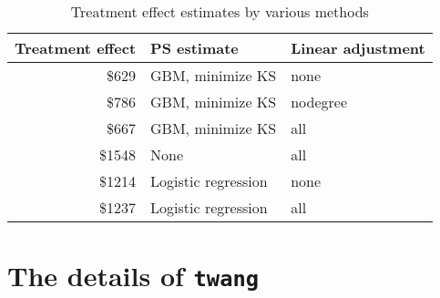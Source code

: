 \documentclass{article}
\begin{document}
\begin{table}[ht]
\begin{center}
\begin{tabular}{rll}
\hline
Treatment effect & PS estimate & Linear adjustment \\
\hline
\$629 & GBM, minimize KS    & none \\
\$786 & GBM, minimize KS    & nodegree\\
\$667 & GBM, minimize KS    & all\\
\$1548 & None                & all\\
\$1214 & Logistic regression & none \\
\$1237 & Logistic regression & all\\
\hline
\end{tabular}
\caption{Treatment effect estimates by various methods}
\label{tab:allTE}
\end{center}
\end{table}

\section{The details of \texttt{twang}}
\end{document}
